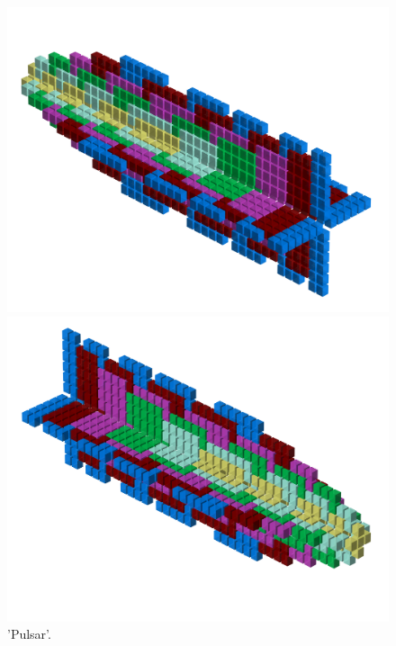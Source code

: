 \begin{minipage}[b]{0.48\linewidth}
\begin{figure}[H]
    \centering
    \begin{adjustbox}{width=6cm,margin=0cm 0cm}
      \includegraphics[width=12cm]{src/patterns/pattern7-45.png}%
    \end{adjustbox}
    \begin{adjustbox}{width=6cm,margin=0cm -1.8cm}
      \includegraphics[width=12cm]{src/patterns/pattern7-225.png}%
    \end{adjustbox}
\caption{'Pulsar'.}
\end{figure}
\end{minipage}
